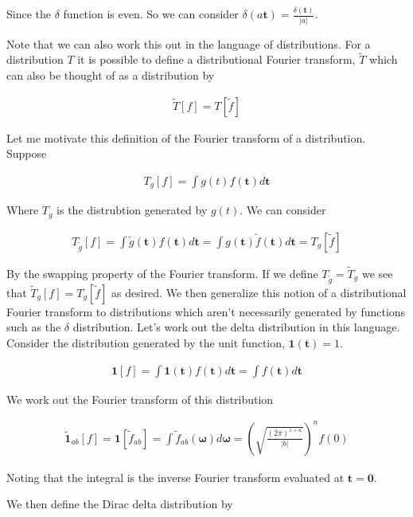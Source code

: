 \documentclass[12pt]{article}
\newcommand{\bv}[1]{\boldsymbol{#1}}
\begin{document}
Since the $\delta$ function is even. So we can consider $\delta(a \bv{t}) = \frac{\delta(\bv{t})}{|a|}$.


Note that we can also work this out in the language of distributions. For a distribution $T$ it is possible to define a distributional Fourier transform, $\tilde{T}$ which can also be thought of as a distribution by

\begin{align}
\tilde{T}[f] = T[\tilde{f}]
\end{align}

Let me motivate this definition of the Fourier transform of a distribution. Suppose

\begin{align}
T_g[f] = \int g(t) f(\bv{t}) d\bv{t}
\end{align}

Where $T_g$ is the distrubtion generated by $g(t)$. We can consider 

\begin{align}
T_{\tilde{g}}[f] = \int \tilde{g}(\bv{t}) f(\bv{t}) d\bv{t} = \int g(\bv{t})\tilde{f}(\bv{t}) d\bv{t} = T_g[\tilde{f}]
\end{align}

By the swapping property of the Fourier transform. If we define $T_{\tilde{g}} = \tilde{T}_g$ we see that $\tilde{T}_{g}[f] = T_g[\tilde{f}]$ as desired. We then generalize this notion of a distributional Fourier transform to distributions which aren't necessarily generated by functions such as the $\delta$ distribution. Let's work out the delta distribution in this language. Consider the distribution generated by the unit function, $\mathbf{1}(\bv{t}) = 1$.

\begin{align}
\mathbf{1}[f] = \int \mathbf{1}(\bv{t}) f(\bv{t}) d\bv{t} = \int f(\bv{t}) d\bv{t}
\end{align}

We work out the Fourier transform of this distribution

\begin{align}
\tilde{\mathbf{1}}_{ab}[f] = \mathbf{1}[\tilde{f}_{ab}] = \int \tilde{f}_{ab}(\bv{\omega}) d\bv{\omega} = \left(\sqrt{\frac{(2\pi)^{1+a}}{|b|}}\right)^n f(0)
\end{align}

Noting that the integral is the inverse Fourier transform evaluated at $\bv{t}=\bv{0}$.

We then define the Dirac delta distribution by
\end{document}
